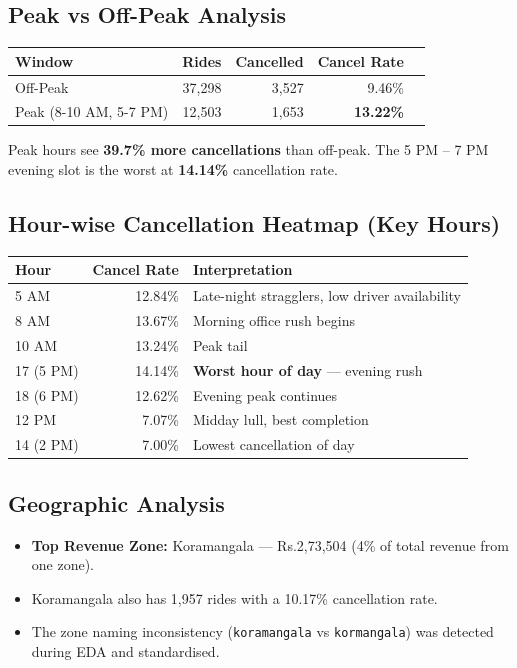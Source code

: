\documentclass[12pt,a4paper]{article}
\begin{document}
\subsection{Peak vs Off-Peak Analysis}
\begin{center}
\begin{tabular}{lrrrr}
\toprule
\textbf{Window} & \textbf{Rides} & \textbf{Cancelled} & \textbf{Cancel Rate} \\
\midrule
Off-Peak & 37,298 & 3,527 & 9.46\% \\
Peak (8-10 AM, 5-7 PM) & 12,503 & 1,653 & \textbf{13.22\%} \\
\bottomrule
\end{tabular}
\end{center}

Peak hours see \textbf{39.7\% more cancellations} than off-peak. The 5 PM -- 7 PM evening slot is the worst at \textbf{14.14\%} cancellation rate.

\subsection{Hour-wise Cancellation Heatmap (Key Hours)}
\begin{center}
\begin{tabular}{lrl}
\toprule
\textbf{Hour} & \textbf{Cancel Rate} & \textbf{Interpretation} \\
\midrule
5 AM & 12.84\% & Late-night stragglers, low driver availability \\
8 AM & 13.67\% & Morning office rush begins \\
10 AM & 13.24\% & Peak tail \\
17 (5 PM) & 14.14\% & \textbf{Worst hour of day} --- evening rush \\
18 (6 PM) & 12.62\% & Evening peak continues \\
12 PM & 7.07\% & Midday lull, best completion \\
14 (2 PM) & 7.00\% & Lowest cancellation of day \\
\bottomrule
\end{tabular}
\end{center}

\subsection{Geographic Analysis}
\begin{itemize}
  \item \textbf{Top Revenue Zone:} Koramangala --- Rs.2,73,504 (4\% of total revenue from one zone).
  \item Koramangala also has 1,957 rides with a 10.17\% cancellation rate.
  \item The zone naming inconsistency (\texttt{koramangala} vs \texttt{kormangala}) was detected during EDA and standardised.
\end{itemize}
\end{document}
